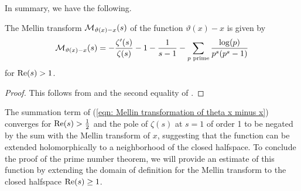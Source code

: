 In summary, we have the following. 
\begin{proposition}\label{prop: Mellin transform of theta function minus x}
    The Mellin transform $\mathcal{M}_{\vartheta(x)-x}(s)$ of the function $\vartheta(x)-x$ is given by 
    \begin{equation*}\label{eqn: Mellin transformation of theta x minus x}
        \mathcal{M}_{\vartheta(x)-x}(s)=-\frac{\zeta'(s)}{\zeta(s)}-1-\frac{1}{s-1}-\sum_{p\text{ prime}}\frac{\log(p)}{p^{s}(p^{s}-1)}
    \end{equation*}
    for $\mathrm{Re}(s)>1$. 
\end{proposition}
\begin{proof}
    This follows from  and the second equality of . 
\end{proof}
The summation term of (\ref{eqn: Mellin transformation of theta x minus x}) converges for $\mathrm{Re}(s)>\frac{1}{2}$ and the pole of $\zeta(s)$ at $s=1$ of order 1 to be negated by the sum with the Mellin transform of $x$, suggesting that the function can be extended holomorphically to a neighborhood of the closed halfspace. To conclude the proof of the prime number theorem, we will provide an estimate of this function by extending the domain of definition for the Mellin transform to the closed halfspace $\mathrm{Re}(s)\geq 1$. 